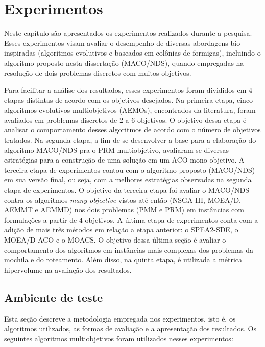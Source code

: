 \chapter[Experimentos]{Experimentos}
\label{chapter_experimentos}

Neste capítulo são apresentados os experimentos realizados durante a pesquisa. Esses experimentos visam avaliar o desempenho de diversas abordagens bio-inspiradas (algoritmos evolutivos e baseados em colônias de formigas), incluindo o algoritmo proposto nesta dissertação (MACO/NDS), quando empregadas na resolução de dois problemas discretos com muitos objetivos. 

Para facilitar a análise dos resultados, esses experimentos foram divididos em 4 etapas distintas de acordo com os objetivos desejados. Na primeira etapa, cinco algoritmos evolutivos multiobjetivos (AEMOs), encontrados da literatura, foram avaliados em problemas discretos de 2 a 6 objetivos. O objetivo dessa etapa é analisar o comportamento desses algoritmos de acordo com o número de objetivos tratados. Na segunda etapa, a fim de se desenvolver a base para a elaboração do algoritmo MACO/NDS pra o PRM multiobjetivo, avaliaram-se diversas estratégias para a construção de uma solução em um ACO mono-objetivo. A terceira etapa de experimentos contou com o algoritmo proposto (MACO/NDS) em sua versão final, ou seja, com a melhores estratégias observadas na segunda etapa de experimentos. O objetivo da terceira etapa foi avaliar o MACO/NDS contra os algoritmos \textit{many-objective} vistos até então (NSGA-III, MOEA/D, AEMMT e AEMMD) nos dois problemas (PMM e PRM) em instâncias com formulações a partir de 4 objetivos. A última etapa de experimentos conta com a adição de mais três métodos em relação a etapa anterior: o SPEA2-SDE, o MOEA/D-ACO e o MOACS. O objetivo dessa última seção é avaliar o comportamento dos algoritmos em instâncias mais complexas dos problemas da mochila e do roteamento. Além disso, na quinta etapa, é utilizada a métrica hipervolume na avaliação dos resultados.

\section{Ambiente de teste}

Esta seção descreve a metodologia empregada nos experimentos, isto é, os algoritmos utilizados, as formas de avaliação e a apresentação dos resultados. Os seguintes algoritmos multiobjetivos foram utilizados nesses experimentos:

